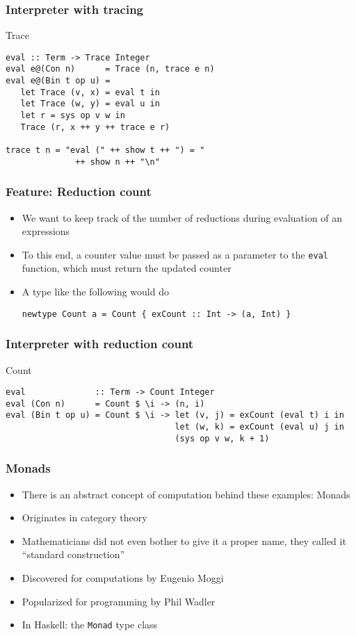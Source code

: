 \documentclass{beamer}
\begin{document}
\begin{frame}[fragile]
  \frametitle{Interpreter with tracing}
  \begin{block}{Trace}
\begin{lstlisting}
eval :: Term -> Trace Integer
eval e@(Con n)      = Trace (n, trace e n)
eval e@(Bin t op u) = 
   let Trace (v, x) = eval t in
   let Trace (w, y) = eval u in
   let r = sys op v w in
   Trace (r, x ++ y ++ trace e r)

trace t n = "eval (" ++ show t ++ ") = "
              ++ show n ++ "\n"
\end{lstlisting}  
\end{block}
\end{frame}

\begin{frame}[fragile]
  \frametitle{Feature: Reduction count}
  \begin{itemize}
  \item We want to keep track of the number of reductions during
    evaluation of an expressions
  \item To this end, a counter value must be passed as a parameter to
    the \lstinline{eval} function, which must return the updated
    counter
  \item A type like the following would do
\begin{lstlisting}
newtype Count a = Count { exCount :: Int -> (a, Int) }
\end{lstlisting}
  \end{itemize}
\end{frame}

\begin{frame}[fragile]
  \frametitle{Interpreter with reduction count}\small
  \begin{block}{Count}
\begin{lstlisting}
eval              :: Term -> Count Integer
eval (Con n)      = Count $ \i -> (n, i)
eval (Bin t op u) = Count $ \i -> let (v, j) = exCount (eval t) i in    
                                  let (w, k) = exCount (eval u) j in
                                  (sys op v w, k + 1)
\end{lstlisting} 
\end{block}
\end{frame}            

\begin{frame}
  \frametitle{Monads}
  \begin{itemize}
  \item There is an abstract concept of computation behind these
    examples: Monads
  \item Originates in category theory
  \item Mathematicians did not even bother to give it a proper name,
    they called it ``standard construction''
  \item Discovered for computations by Eugenio Moggi
  \item Popularized for programming by Phil Wadler
  \item In Haskell: the \lstinline{Monad} type class
  \end{itemize}
\end{frame}
\end{document}
